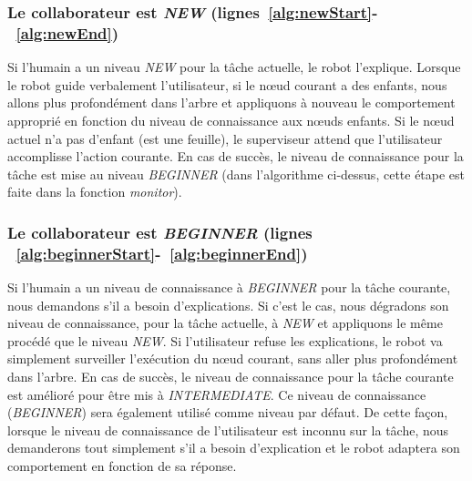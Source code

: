 \documentclass[a4paper,11pt,twoside]{StyleThese}
\begin{document}
\subsubsection{Le collaborateur est \textit{NEW} (lignes~\ref{alg:newStart}-~\ref{alg:newEnd})} Si l'humain a un niveau \textit{NEW} pour la tâche actuelle, le robot l'explique.
Lorsque le robot guide verbalement l'utilisateur, si le nœud courant a des enfants, nous allons plus profondément dans l'arbre et appliquons à nouveau le comportement approprié en fonction du niveau de connaissance aux nœuds enfants. Si le nœud actuel n'a pas d'enfant (est une feuille), le superviseur attend que l'utilisateur accomplisse l'action courante. En cas de succès, le niveau de connaissance pour la tâche est mise au niveau \textit{BEGINNER} (dans l'algorithme ci-dessus, cette étape est faite dans la fonction \textit{monitor}).



\subsubsection{Le collaborateur est \textit{BEGINNER} (lignes ~\ref{alg:beginnerStart}-~\ref{alg:beginnerEnd})} Si l'humain a un niveau de connaissance à \textit{BEGINNER} pour la tâche courante, nous demandons s'il a besoin d'explications. Si c'est le cas, nous dégradons son niveau de connaissance, pour la tâche actuelle, à \textit{NEW} et appliquons le même procédé que le niveau \textit{NEW}. Si l'utilisateur refuse les explications, le robot va simplement surveiller l'exécution du nœud courant, sans aller plus profondément dans l'arbre. En cas de succès, le niveau de connaissance pour la tâche courante est amélioré pour être mis à \textit{INTERMEDIATE}. Ce niveau de connaissance (\textit{BEGINNER}) sera également utilisé comme niveau par défaut. De cette façon, lorsque le niveau de connaissance de l'utilisateur est inconnu sur la tâche, nous demanderons tout simplement s'il a besoin d'explication et le robot adaptera son comportement en fonction de sa réponse.
\end{document}
